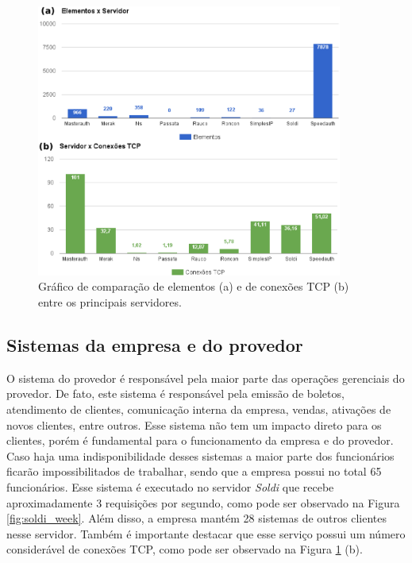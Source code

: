 \begin{figure}[h!]
 \centering
 \includegraphics[width=380px]{img/elementos_tcp.eps}
 \caption{Gráfico de comparação de elementos (a) e de conexões TCP (b) entre os principais servidores.}
 \label{fig:elementos_tcp}
\end{figure}

\subsection{Sistemas da empresa e do provedor}
\label{section:sistemas}

O sistema do provedor é responsável pela maior parte das operações gerenciais do provedor. De fato, este sistema é responsável pela emissão de 
boletos, atendimento de clientes, comunicação interna da empresa, vendas, ativações de novos clientes, entre outros. Esse sistema não tem um 
impacto direto para os clientes, porém é fundamental para o funcionamento da empresa e do provedor. Caso haja uma indisponibilidade desses sistemas 
a maior parte dos funcionários ficarão impossibilitados de trabalhar, sendo que a empresa possui no total 65 funcionários.
Esse sistema é executado no servidor \textit{Soldi} que recebe aproximadamente 3 requisições  \cite{tanenbaum2011} por segundo, como 
pode ser observado na Figura \ref{fig:soldi_week}. Além disso, a empresa mantém 28 sistemas de outros clientes nesse servidor. 
Também é importante destacar que esse serviço possui um número considerável de conexões \ac{TCP}, como pode ser observado na Figura 
\ref{fig:elementos_tcp} (b).

